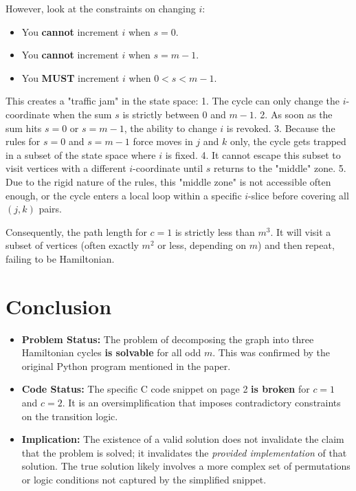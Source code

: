 \documentclass[12pt]{article}
\begin{document}
However, look at the constraints on changing $i$:
\begin{itemize}
    \item You \textbf{cannot} increment $i$ when $s=0$.
    \item You \textbf{cannot} increment $i$ when $s=m-1$.
    \item You \textbf{MUST} increment $i$ when $0 < s < m-1$.
\end{itemize}

This creates a "traffic jam" in the state space:
1.  The cycle can only change the $i$-coordinate when the sum $s$ is strictly between $0$ and $m-1$.
2.  As soon as the sum hits $s=0$ or $s=m-1$, the ability to change $i$ is revoked.
3.  Because the rules for $s=0$ and $s=m-1$ force moves in $j$ and $k$ only, the cycle gets trapped in a subset of the state space where $i$ is fixed.
4.  It cannot escape this subset to visit vertices with a different $i$-coordinate until $s$ returns to the "middle" zone.
5.  Due to the rigid nature of the rules, this "middle zone" is not accessible often enough, or the cycle enters a local loop within a specific $i$-slice before covering all $(j,k)$ pairs.

Consequently, the path length for $c=1$ is strictly less than $m^3$. It will visit a subset of vertices (often exactly $m^2$ or less, depending on $m$) and then repeat, failing to be Hamiltonian.

\section{Conclusion}
\begin{itemize}
    \item \textbf{Problem Status:} The problem of decomposing the graph into three Hamiltonian cycles \textbf{is solvable} for all odd $m$. This was confirmed by the original Python program mentioned in the paper.
    \item \textbf{Code Status:} The specific C code snippet on page 2 \textbf{is broken} for $c=1$ and $c=2$. It is an oversimplification that imposes contradictory constraints on the transition logic.
    \item \textbf{Implication:} The existence of a valid solution does not invalidate the claim that the problem is solved; it invalidates the \textit{provided implementation} of that solution. The true solution likely involves a more complex set of permutations or logic conditions not captured by the simplified snippet.
\end{itemize}
\end{document}
